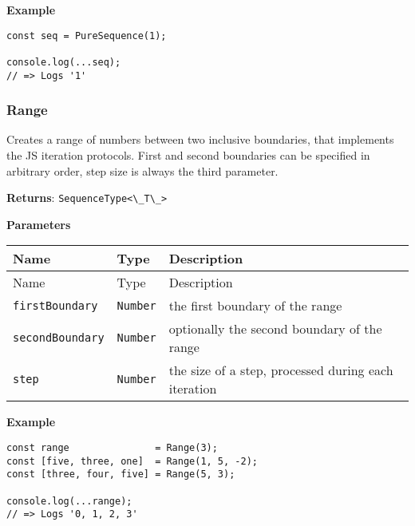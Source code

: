 \textbf{Example}

\begin{lstlisting}[label=2effd3f2-45c8-4259-a1bd-334cff141bed]
const seq = PureSequence(1);
                            
console.log(...seq);
// => Logs '1'
\end{lstlisting}

\hypertarget{e7e1ec85-cbd1-4fcc-82b6-64656687aa6d}{%
\subsubsection{Range}\label{e7e1ec85-cbd1-4fcc-82b6-64656687aa6d}}

Creates a range of numbers between two inclusive boundaries, that
implements the JS iteration protocols. First and second boundaries can
be specified in arbitrary order, step size is always the third
parameter.

\textbf{Returns}: \passthrough{\lstinline!SequenceType<\_T\_>!}

\textbf{Parameters}

\begin{longtable}[]{
  >{\raggedright\arraybackslash}p{}
  >{\raggedright\arraybackslash}p{}
  >{\raggedright\arraybackslash}p{}@{}}

\toprule\noalign{}
Name & Type & Description \\
\midrule\noalign{}
\endfirsthead
\toprule\noalign{}
Name & Type & Description \\
\midrule\noalign{}
\endhead
\bottomrule\noalign{}
\endlastfoot
\passthrough{\lstinline!firstBoundary!} &
\passthrough{\lstinline!Number!} & the first boundary of the range \\
\passthrough{\lstinline!secondBoundary!} &
\passthrough{\lstinline!Number!} & optionally the second boundary of the
range \\
\passthrough{\lstinline!step!} & \passthrough{\lstinline!Number!} & the
size of a step, processed during each iteration \\
\end{longtable}

\textbf{Example}

\begin{lstlisting}[label=a80a2826-2fd4-4453-9a72-3115be56483c]
const range               = Range(3);
const [five, three, one]  = Range(1, 5, -2);
const [three, four, five] = Range(5, 3);
                                            
console.log(...range);
// => Logs '0, 1, 2, 3'
\end{lstlisting}


